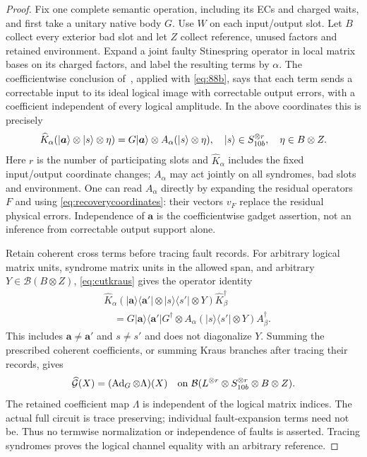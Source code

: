\begin{proof}
Fix one complete semantic operation, including its ECs and charged waits, and first take a unitary native body $G$. Use $W$ on each input/output slot. Let $B$ collect every exterior bad slot and let $Z$ collect reference, unused factors and retained environment. Expand a joint faulty Stinespring operator in local matrix bases on its charged factors, and label the resulting terms by $\alpha$. The coefficientwise conclusion of~\cite[Lemma~5.2, final proof paragraph]{DMMemory2026}, applied with \eqref{eq:88b}, says that each term sends a correctable input to its ideal logical image with correctable output errors, with a coefficient independent of every logical amplitude. In the above coordinates this is precisely
\begin{equation}\label{eq:cutkraus}
 \widehat K_\alpha(\lvert \boldsymbol a\rangle\otimes\lvert s\rangle\otimes\eta)
   =G\lvert \boldsymbol a\rangle\otimes A_\alpha(\lvert s\rangle\otimes\eta),
 \quad \lvert s\rangle\in S_{10b}^{\otimes r},\quad \eta\in B\otimes Z.
\end{equation}
Here $r$ is the number of participating slots and $\widehat K_\alpha$ includes the fixed input/output coordinate changes; $A_\alpha$ may act jointly on all syndromes, bad slots and environment. One can read $A_\alpha$ directly by expanding the residual operators $F$ and using \eqref{eq:recoverycoordinates}: their vectors $v_F$ replace the residual physical errors. Independence of $\boldsymbol a$ is the coefficientwise gadget assertion, not an inference from correctable output support alone.

Retain coherent cross terms before tracing fault records. For arbitrary logical matrix units, syndrome matrix units in the allowed span, and arbitrary $Y\in\mathcal B(B\otimes Z)$, \eqref{eq:cutkraus} gives the operator identity
\begin{equation}\label{eq:jointcut}
\begin{split}
 &\widehat K_\alpha
 (|\boldsymbol a\rangle\langle\boldsymbol a'|
       \otimes|s\rangle\langle s'|\otimes Y)
 \widehat K_\beta^\dagger\\
 &\quad =
 G|\boldsymbol a\rangle\langle\boldsymbol a'|G^\dagger
 \otimes A_\alpha(|s\rangle\langle s'|\otimes Y)A_\beta^\dagger .
\end{split}
\end{equation}
This includes $\boldsymbol a\ne\boldsymbol a'$ and $s\ne s'$ and does not diagonalize $Y$. Summing the prescribed coherent coefficients, or summing Kraus branches after tracing their records, gives
\[
 \widehat{\mathcal G}(X)
   =(\operatorname{Ad}_G\otimes\Lambda)(X)
 \quad\hbox{on }\mathcal B(L^{\otimes r}\otimes S_{10b}^{\otimes r}\otimes B\otimes Z).
\]
The retained coefficient map $\Lambda$ is independent of the logical matrix indices. The actual full circuit is trace preserving; individual fault-expansion terms need not be. Thus no termwise normalization or independence of faults is asserted. Tracing syndromes proves the logical channel equality with an arbitrary reference.


\end{proof}
